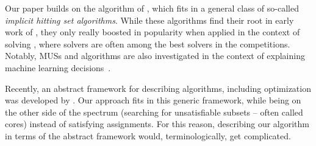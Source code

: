 Our paper builds on the algorithm of \citet{ignatiev2015smallest}, which fits in a general class of so-called \emph{implicit hitting set algorithms}.
While these algorithms find their root in early work of \citet{ai/Reiter87}, they only really boosted in popularity when applied in the context of \maxsat solving \cite{DBLP:conf/cp/DaviesB11,DBLP:conf/sat/DaviesB13,davies}, where \hitsetbased solvers are often among the best solvers in the competitions. 
Notably, MUSs and \hitsetbased algorithms are also investigated in the context of explaining machine learning decisions~\cite{ignatiev2019abduction}.


Recently, an abstract framework for describing \hitsetbased algorithms, including optimization was developed by \citet{DBLP:conf/kr/SaikkoWJ16}. Our approach fits in this generic framework, while being on the other side of the spectrum (searching for unsatisfiable subsets -- often called cores) instead of satisfying assignments. For this reason, describing our algorithm in terms of the abstract framework would, terminologically, get complicated. 


